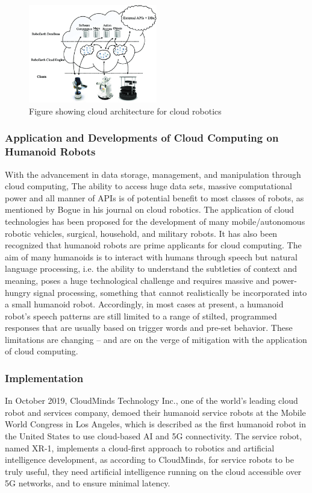 \documentclass[conference]{IEEEtran}
\begin{document}
\begin{figure}[h]
    \centerline{\includegraphics[width=0.5\textwidth]{prerak_images/Picture1.png}}
    \caption{Figure showing cloud architecture for cloud robotics\autocite{13wan2016cloud}}
\label{prerakfig1}
\end{figure}

\subsubsection{Application and Developments of Cloud Computing on Humanoid Robots}
With the advancement in data storage, management, and manipulation through cloud computing, The ability to access huge data sets, massive computational power and all manner of APIs is of potential benefit to most classes of robots, as mentioned by Bogue in his journal on cloud robotics\autocite{3bogue2017cloud}. The application of cloud technologies has been proposed for the development of many mobile/autonomous robotic vehicles, surgical, household, and military robots. It has also been recognized that humanoid robots are prime applicants for cloud computing. The aim of many humanoids is to interact with humans through speech but natural language processing, i.e. the ability to understand the subtleties of context and meaning, poses a huge technological challenge and requires massive and power-hungry signal processing, something that cannot realistically be incorporated into a small humanoid robot. Accordingly, in most cases at present, a humanoid robot's speech patterns are still limited to a range of stilted, programmed responses that are usually based on trigger words and pre-set behavior\autocite{3bogue2017cloud}. These limitations are changing – and are on the verge of mitigation with the application of cloud computing.

\subsubsection{Implementation}
In October 2019, CloudMinds Technology Inc., one of the world's leading cloud robot and services company, demoed their humanoid service robots at the Mobile World Congress in Los Angeles, which is described as the first humanoid robot in the United States to use cloud-based AI and 5G connectivity. The service robot, named XR-1, implements a cloud-first approach to robotics and artificial intelligence development, as according to CloudMinds, for service robots to be truly useful, they need artificial intelligence running on the cloud accessible over 5G networks, and to ensure minimal latency\autocite{4demaitre_demaitre_2020}.
\end{document}
